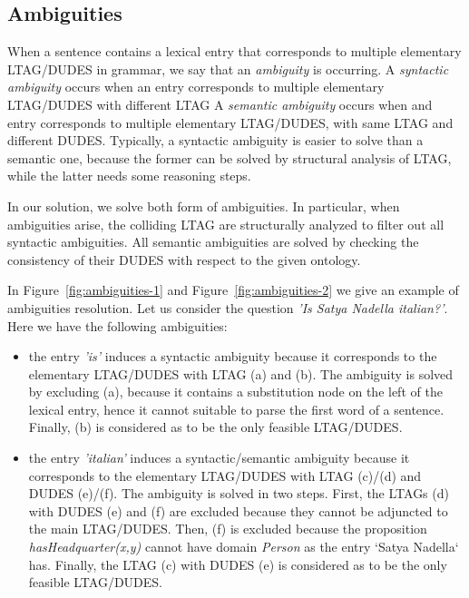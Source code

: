 \subsection{Ambiguities}
\label{sec:parsing-ambiguities}

When a sentence contains a lexical entry that corresponds to multiple elementary LTAG/DUDES in grammar, we say that an \textit{ambiguity} is occurring.
%
A \textit{syntactic ambiguity} occurs when an entry corresponds to multiple elementary LTAG/DUDES with different LTAG
%
A \textit{semantic ambiguity} occurs when and entry corresponds to multiple elementary LTAG/DUDES, with same LTAG and different DUDES.
%
Typically, a syntactic ambiguity is easier to solve than a semantic one, because the former can be solved by structural analysis of LTAG, while the latter needs some reasoning steps.

In our solution, we solve both form of ambiguities.
%
In particular, when ambiguities arise, the colliding LTAG are structurally analyzed to filter out all syntactic ambiguities.
%
All semantic ambiguities are solved by checking the consistency of their DUDES with respect to the given ontology.

In Figure~\ref{fig:ambiguities-1} and Figure~\ref{fig:ambiguities-2} we give an example of ambiguities resolution.
%
Let us consider the question \textit{'Is Satya Nadella italian?'}. Here we have the following ambiguities:

\begin{itemize}
\item the entry \textit{'is'} induces a syntactic ambiguity because it corresponds to the elementary LTAG/DUDES with LTAG (a) and (b).
%
The ambiguity is solved by excluding (a), because it contains a substitution node on the left of the lexical entry, hence it cannot suitable to parse the first word of a sentence. 
%
Finally, (b) is considered as to be the only feasible LTAG/DUDES.

\item the entry \textit{'italian'} induces a syntactic/semantic ambiguity because it corresponds to the elementary LTAG/DUDES with LTAG (c)/(d) and DUDES (e)/(f).
%
The ambiguity is solved in two steps.
%
First, the LTAGs (d) with DUDES (e) and (f) are excluded because they cannot be adjuncted to the main LTAG/DUDES.
%
Then, (f) is excluded because the proposition \textit{hasHeadquarter(x,y)} cannot have domain \textit{Person} as the entry `Satya Nadella` has.
%
Finally, the LTAG (c) with DUDES (e) is considered as to be the only feasible LTAG/DUDES.
\end{itemize}

